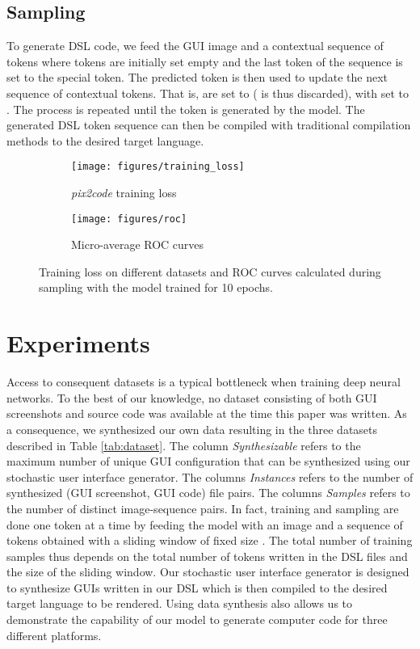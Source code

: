 \documentclass{article}
\begin{document}
\subsection{Sampling}

To generate DSL code, we feed the GUI image  and a contextual sequence  of  tokens where tokens  are initially set empty and the last token of the sequence  is set to the special  token. The predicted token  is then used to update the next sequence of contextual tokens. That is,  are set to  ( is thus discarded), with  set to . The process is repeated until the token  is generated by the model.
The generated DSL token sequence can then be compiled with traditional compilation methods to the desired target language.

\begin{figure}[H]
    \begin{subfigure}{.5\textwidth}
        \centering
        \texttt{[image: figures/training\_loss]}
        \caption{\emph{pix2code} training loss}
    \end{subfigure}
    \begin{subfigure}{.5\textwidth}
        \centering
        \texttt{[image: figures/roc]}
        \caption{Micro-average ROC curves}
    \end{subfigure}
    \caption{Training loss on different datasets and ROC curves calculated during sampling with the model trained for 10 epochs.}
    \label{fig:training_stats}
\end{figure}

\section{Experiments}

Access to consequent datasets is a typical bottleneck when training deep neural networks. To the best of our knowledge, no dataset consisting of both GUI screenshots and source code was available at the time this paper was written. As a consequence, we synthesized our own data resulting in the three datasets described in Table \ref{tab:dataset}. The column \emph{Synthesizable} refers to the maximum number of unique GUI configuration that can be synthesized using our stochastic user interface generator. The columns \emph{Instances} refers to the number of synthesized (GUI screenshot, GUI code) file pairs. The columns \emph{Samples} refers to the number of distinct image-sequence pairs. In fact, training and sampling are done one token at a time by feeding the model with an image and a sequence of tokens obtained with a sliding window of fixed size . The total number of training samples thus depends on the total number of tokens written in the DSL files and the size of the sliding window. Our stochastic user interface generator is designed to synthesize GUIs written in our DSL which is then compiled to the desired target language to be rendered. Using data synthesis also allows us to demonstrate the capability of our model to generate computer code for three different platforms.
\end{document}
